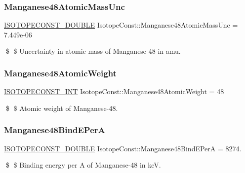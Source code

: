 \subsubsection{\texorpdfstring{Manganese48\+Atomic\+Mass\+Unc}{Manganese48AtomicMassUnc}}
{\footnotesize\ttfamily \mbox{\hyperlink{group___isotope_const-_macros_ga8f45a7272ce02c0b4c65c44636ed719a}{I\+S\+O\+T\+O\+P\+E\+C\+O\+N\+S\+T\+\_\+\+D\+O\+U\+B\+LE}} Isotope\+Const\+::\+Manganese48\+Atomic\+Mass\+Unc = 7.\+449e-\/06}

\$ \$ Uncertainty in atomic mass of Manganese-\/48 in amu. \mbox{\label{group___isotope_const-_manganese-_mn48_ga2f5138870bd82c060b2f151cddad07ad}} 
\subsubsection{\texorpdfstring{Manganese48\+Atomic\+Weight}{Manganese48AtomicWeight}}
{\footnotesize\ttfamily \mbox{\hyperlink{group___isotope_const-_macros_ga5f18360b3e99483a35c32d789e62621c}{I\+S\+O\+T\+O\+P\+E\+C\+O\+N\+S\+T\+\_\+\+I\+NT}} Isotope\+Const\+::\+Manganese48\+Atomic\+Weight = 48}

\$ \$ Atomic weight of Manganese-\/48. \mbox{\label{group___isotope_const-_manganese-_mn48_ga59a1f18f42ae9d2be32c03c393e8764b}} 
\subsubsection{\texorpdfstring{Manganese48\+Bind\+E\+PerA}{Manganese48BindEPerA}}
{\footnotesize\ttfamily \mbox{\hyperlink{group___isotope_const-_macros_ga8f45a7272ce02c0b4c65c44636ed719a}{I\+S\+O\+T\+O\+P\+E\+C\+O\+N\+S\+T\+\_\+\+D\+O\+U\+B\+LE}} Isotope\+Const\+::\+Manganese48\+Bind\+E\+PerA = 8274.}

\$ \$ Binding energy per A of Manganese-\/48 in keV. \mbox{\label{group___isotope_const-_manganese-_mn48_ga612d9cc4bd0208bfd4e7e93de3ebfc80}} 
